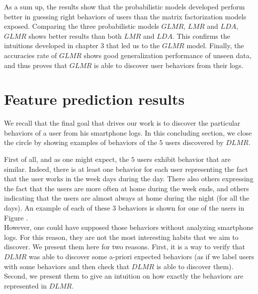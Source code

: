 As a sum up, the results show that the probabilistic models developed perform better in guessing right behaviors of users than the matrix factorization models exposed. Comparing the three probabilistic models $GLMR$, $LMR$ and $LDA$, $GLMR$ shows better results than both $LMR$ and $LDA$. This confirms the intuitions developed in chapter 3 that led us to the $GLMR$ model. Finally, the accuracies rate of $GLMR$ shows good generalization performance of unseen data, and thus proves that $GLMR$ is able to discover user behaviors from their logs.



\section{Feature prediction results}
We recall that the final goal that drives our work is to discover the particular behaviors of a user from his smartphone logs. In this concluding section, we close the circle by showing examples of behaviors of the $5$ users discovered by $DLMR$. \par

First of all, and as one might expect, the $5$ users exhibit behavior that are similar. Indeed, there is at least one behavior for each user representing the fact that the user works in the week days during the day. There also others expressing the fact that the users are more often at home during the week ends, and others indicating that the users are almost always at home during the night (for all the days). An example of each of these $3$ behaviors is shown for one of the users in Figure . 
\\However, one could have supposed those behaviors without analyzing smartphone logs. For this reason, they are not the most interesting habits that we aim to discover. We present them here for two reasons. First, it is a way to verify that $DLMR$ was able to discover some a-priori expected behaviors (as if we label users with some behaviors and then check that $DLMR$ is able to discover them). Second, we present them to give an intuition on how exactly the behaviors are represented in $DLMR$. \par

